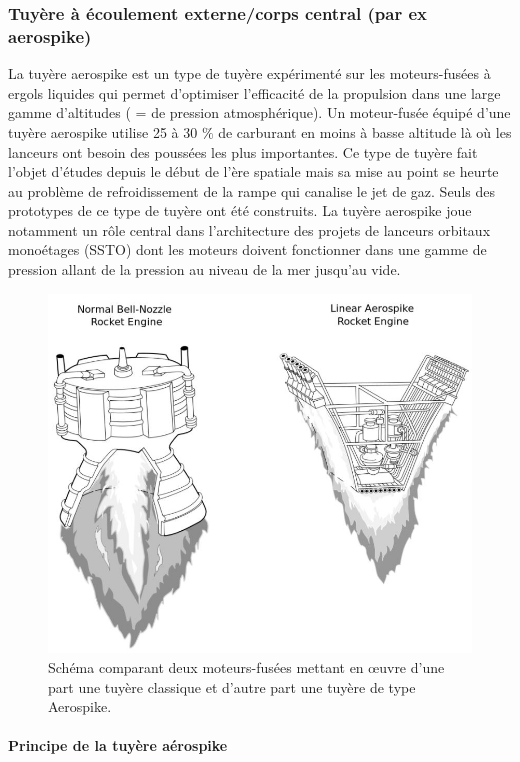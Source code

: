 \documentclass{report}
\begin{document}
\subsubsection{Tuyère à écoulement externe/corps central (par ex aerospike)}

La tuyère aerospike est un type de tuyère expérimenté sur les moteurs-fusées à ergols liquides qui permet d'optimiser l'efficacité de la propulsion dans une large gamme d'altitudes ( = de pression atmosphérique). Un moteur-fusée équipé d'une tuyère aerospike utilise 25 à 30 $\%$ de carburant en moins à basse altitude là où les lanceurs ont besoin des poussées les plus importantes. Ce type de tuyère fait l'objet d'études depuis le début de l'ère spatiale mais sa mise au point se heurte au problème de refroidissement de la rampe qui canalise le jet de gaz. Seuls des prototypes de ce type de tuyère ont été construits. La tuyère aerospike joue notamment un rôle central dans l’architecture des projets de lanceurs orbitaux monoétages (SSTO) dont les moteurs doivent fonctionner dans une gamme de pression allant de la pression au niveau de la mer jusqu'au vide.

\begin{figure}[h!]
    \centering
    \includegraphics[scale=0.4]{50.JPG}
    \caption{Schéma comparant deux moteurs-fusées mettant en œuvre d'une part une tuyère classique et d'autre part une tuyère de type Aerospike.}
    \label{50}
\end{figure}

\paragraph{Principe de la tuyère aérospike}
\end{document}
